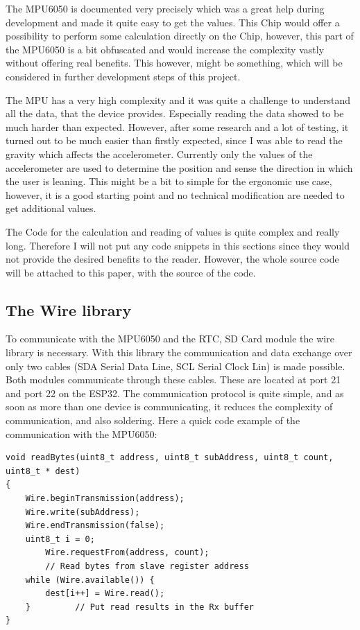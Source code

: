 The MPU6050 is documented very precisely which was a great help during development and made it quite easy to get the values. This Chip would offer a possibility to perform some calculation directly on the Chip, however, this part of the MPU6050 is a bit obfuscated and would increase the complexity vastly without offering real benefits. This however, might be something, which will be considered in further development steps of this project.

The MPU has a very high complexity and it was quite a challenge to understand all the data, that the device provides. Especially reading the data showed to be much harder than expected. However, after some research and a lot of testing, it turned out to be much easier than firstly expected, since I was able to read the gravity which affects the accelerometer.
Currently only the values of the accelerometer are used to determine the position and sense the direction in which the user is leaning. This might be a bit to simple for the ergonomic use case, however, it is a good starting point and no technical modification are needed to get additional values.

The Code for the calculation and reading of values is quite complex and really long. Therefore I will not put any code snippets in this sections since they would not provide the desired benefits to the reader. However, the whole source code will be attached to this paper, with the source of the code. \cite{TDKAttra32:online}

\newpage

\subsection{The Wire library}

To communicate with the MPU6050 and the RTC, SD Card module the wire library is necessary. With this library the communication and data exchange over only two cables (SDA Serial Data Line, SCL Serial Clock Lin) is made possible. Both modules communicate through these cables. These are located at port 21 and port 22 on the ESP32. The communication protocol is quite simple, and as soon as more than one device is communicating, it reduces the complexity of communication, and also soldering. Here a quick code example of the communication with the MPU6050:
\begin{lstlisting}
void readBytes(uint8_t address, uint8_t subAddress, uint8_t count, uint8_t * dest)
{  
	Wire.beginTransmission(address);   
	Wire.write(subAddress);            
	Wire.endTransmission(false);       
	uint8_t i = 0;
        Wire.requestFrom(address, count);  
        // Read bytes from slave register address 
	while (Wire.available()) {
        dest[i++] = Wire.read(); 
    }         // Put read results in the Rx buffer
}
\end{lstlisting}
\cite{MPU9250M94:online}

